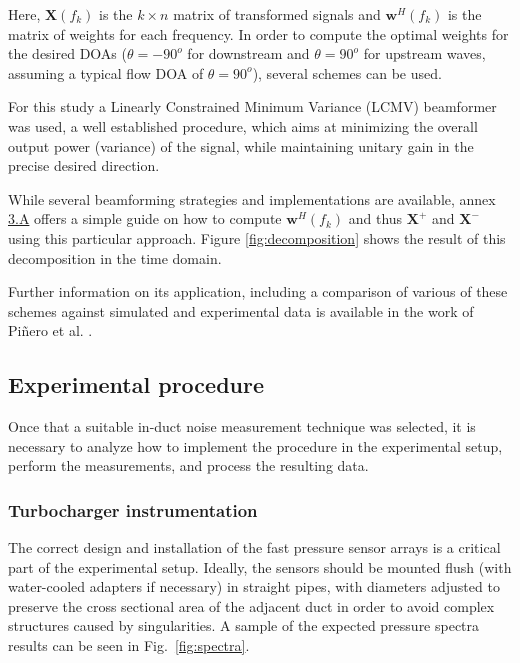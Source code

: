 Here, $\mathbf X(f_k)$ is the $k \times n$ matrix of transformed signals and $\mathbf w^H(f_k)$ is the matrix of weights for each frequency. In order to compute the optimal weights for the desired DOAs ($\theta=-90^o$ for downstream and $\theta=90^o$ for upstream waves, assuming a typical flow DOA of $\theta=90^o$), several schemes can be used.

For this study a Linearly Constrained Minimum Variance (LCMV) beamformer was  used, a well established procedure, which aims at minimizing the overall output power (variance) of the signal, while maintaining unitary gain in the precise desired direction.

While several beamforming strategies and implementations are available, annex \hyperref[ann:beamformer]{3.A} offers a simple guide on how to compute $\mathbf w^H(f_k)$ and thus $\mathbf X^+$ and $\mathbf X^-$ using this particular approach. Figure \ref{fig:decomposition} shows the result of this decomposition in the time domain.

Further information on its application, including a comparison of various of these schemes against simulated and experimental data is available in the work of Piñero et al. \cite{pinero2000estimation}.

\subsection{Experimental procedure}
\label{sec:experimental_procedure}

Once that a suitable in-duct noise measurement technique was  selected, it is necessary to analyze how to implement the procedure in the experimental setup, perform the measurements, and process the resulting data.

\subsubsection{Turbocharger instrumentation}
\label{sub:turbocharger_instrumentation}

The correct design and installation of the fast pressure sensor arrays is a critical part of the experimental setup. Ideally, the sensors should be mounted flush (with water-cooled adapters if necessary) in straight pipes, with diameters adjusted to preserve the cross sectional area of the adjacent duct in order to avoid complex structures caused by singularities. A sample of the expected pressure spectra results can be seen in Fig.~\ref{fig:spectra}.

